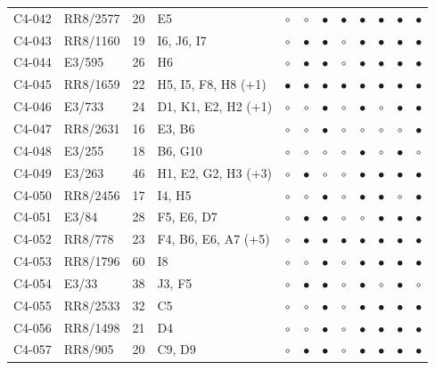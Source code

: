 {\begin{longtable}{llrp{3.9cm}cccccccc}
    C4-042 & RR8/2577 & 20 & E5 & $\circ$ & $\circ$ & $\bullet$ & $\bullet$ & $\bullet$ & $\bullet$ & $\bullet$ & $\bullet$ \\
    C4-043 & RR8/1160 & 19 & I6, J6, I7 & $\circ$ & $\bullet$ & $\bullet$ & $\circ$ & $\bullet$ & $\bullet$ & $\bullet$ & $\bullet$ \\
    C4-044 & E3/595 & 26 & H6 & $\circ$ & $\bullet$ & $\bullet$ & $\circ$ & $\bullet$ & $\bullet$ & $\bullet$ & $\bullet$ \\
    C4-045 & RR8/1659 & 22 & H5, I5, F8, H8 (+1) & $\bullet$ & $\bullet$ & $\bullet$ & $\bullet$ & $\bullet$ & $\bullet$ & $\bullet$ & $\bullet$ \\
    C4-046 & E3/733 & 24 & D1, K1, E2, H2 (+1) & $\circ$ & $\circ$ & $\bullet$ & $\circ$ & $\bullet$ & $\circ$ & $\bullet$ & $\bullet$ \\
    C4-047 & RR8/2631 & 16 & E3, B6 & $\circ$ & $\circ$ & $\bullet$ & $\circ$ & $\circ$ & $\circ$ & $\circ$ & $\bullet$ \\
    C4-048 & E3/255 & 18 & B6, G10 & $\circ$ & $\circ$ & $\circ$ & $\circ$ & $\bullet$ & $\circ$ & $\bullet$ & $\circ$ \\
    C4-049 & E3/263 & 46 & H1, E2, G2, H3 (+3) & $\circ$ & $\bullet$ & $\circ$ & $\circ$ & $\bullet$ & $\bullet$ & $\bullet$ & $\bullet$ \\
    C4-050 & RR8/2456 & 17 & I4, H5 & $\circ$ & $\circ$ & $\bullet$ & $\circ$ & $\bullet$ & $\bullet$ & $\circ$ & $\bullet$ \\
    C4-051 & E3/84 & 28 & F5, E6, D7 & $\circ$ & $\bullet$ & $\bullet$ & $\circ$ & $\circ$ & $\bullet$ & $\bullet$ & $\bullet$ \\
    C4-052 & RR8/778 & 23 & F4, B6, E6, A7 (+5) & $\circ$ & $\bullet$ & $\bullet$ & $\bullet$ & $\bullet$ & $\bullet$ & $\bullet$ & $\bullet$ \\
    C4-053 & RR8/1796 & 60 & I8 & $\circ$ & $\circ$ & $\bullet$ & $\circ$ & $\bullet$ & $\bullet$ & $\bullet$ & $\bullet$ \\
    C4-054 & E3/33 & 38 & J3, F5 & $\circ$ & $\bullet$ & $\bullet$ & $\circ$ & $\bullet$ & $\circ$ & $\bullet$ & $\circ$ \\
    C4-055 & RR8/2533 & 32 & C5 & $\circ$ & $\circ$ & $\bullet$ & $\circ$ & $\bullet$ & $\bullet$ & $\bullet$ & $\bullet$ \\
    C4-056 & RR8/1498 & 21 & D4 & $\circ$ & $\circ$ & $\bullet$ & $\circ$ & $\bullet$ & $\bullet$ & $\bullet$ & $\bullet$ \\
    C4-057 & RR8/905 & 20 & C9, D9 & $\circ$ & $\bullet$ & $\bullet$ & $\circ$ & $\bullet$ & $\bullet$ & $\bullet$ & $\bullet$ \\

\end{longtable}}
